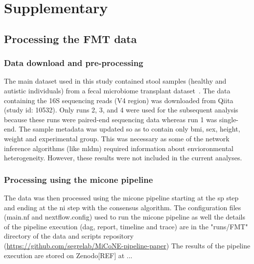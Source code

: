 
\newpage
\section*{Supplementary}

  \renewcommand{\thefigure}{S\arabic{figure}}
  \setcounter{figure}{0}

  \renewcommand{\thetable}{S\arabic{table}}
  \setcounter{table}{0}

  

  \subsection*{Processing the FMT data}

    \subsubsection*{Data download and pre-processing}
    The main dataset used in this study contained stool samples (healthy and autistic individuals) from a fecal microbiome transplant dataset~\cite{Kang2017}.
    The data containing the 16S sequencing reads (V4 region) was downloaded from Qiita~\cite{qiita} (study id: 10532).
    Only runs 2, 3, and 4 were used for the subsequent analysis because these runs were paired-end sequencing data whereas run 1 was single-end.
    The sample metadata was updated so as to contain only bmi, sex, height, weight and experimental group.
    This was necessary as some of the network inference algorithms (like \ac{mldm}) required information about envioronmental heterogeneity.
    However, these results were not included in the current analyses.

    \subsubsection*{Processing using the \ac{micone} pipeline}
    The data was then processed using the \ac{micone} pipeline starting at the \ac{sp} step and ending at the \ac{ni} step with the consensus algorithm.
    The configuration files (main.nf and nextflow.config) used to run the \ac{micone} pipeline as well the details of the pipeline execution (dag, report, timeline and trace) are in the "runs/FMT" directory of the data and scripts repository (\href{https://github.com/segrelab/MiCoNE-pipeline-paper}{https://github.com/segrelab/MiCoNE-pipeline-paper})
    The results of the pipeline execution are stored on Zenodo[REF] at ...

